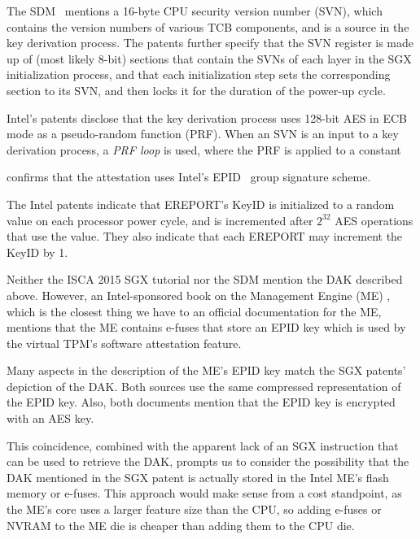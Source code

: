 The SDM~\cite{intel2015sdm} mentions a 16-byte CPU security version number
(SVN), which contains the version numbers of various TCB components, and is a
source in the key derivation process. The patents further specify that the SVN
register is made up of (most likely 8-bit) sections that contain the SVNs of
each layer in the SGX initialization process, and that each initialization step
sets the corresponding section to its SVN, and then locks it for the duration
of the power-up cycle.

Intel's patents disclose that the key derivation process uses 128-bit AES in
ECB mode as a pseudo-random function (PRF). When an SVN is an input to a key
derivation process, a \textit{PRF loop} is used, where the PRF is applied to
a constant

\cite{anati2013sgx} confirms that the attestation uses Intel's
EPID~\cite{brickell2009epid} group signature scheme.

The Intel patents indicate that EREPORT's KeyID is initialized to a random
value on each processor power cycle, and is incremented after $2^{32}$ AES
operations that use the value. They also indicate that each EREPORT may
increment the KeyID by 1.




Neither the ISCA 2015 SGX tutorial nor the SDM mention the DAK described above.
However, an Intel-sponsored book on the Management Engine (ME)
\cite{ruan2014intelme}, which is the closest thing we have to an official
documentation for the ME, mentions that the ME contains e-fuses that store an
EPID key which is used by the virtual TPM's software attestation feature.

Many aspects in the description of the ME's EPID key match the SGX patents'
depiction of the DAK. Both sources use the same compressed representation of
the EPID key. Also, both documents mention that the EPID key is encrypted with
an AES key.

This coincidence, combined with the apparent lack of an SGX instruction that
can be used to retrieve the DAK, prompts us to consider the possibility that
the DAK mentioned in the SGX patent is actually stored in the Intel ME's flash
memory or e-fuses. This approach would make sense from a cost standpoint, as
the ME's core uses a larger feature size than the CPU, so adding e-fuses or
NVRAM to the ME die is cheaper than adding them to the CPU die.

